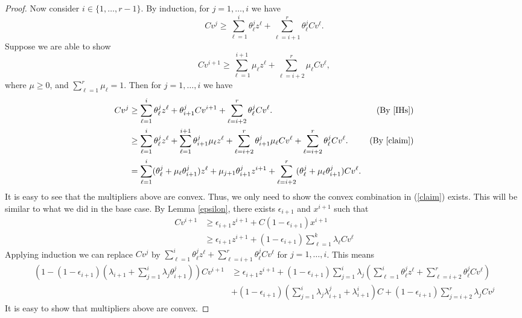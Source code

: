 \begin{proof}
	Now consider $i\in \{1,\ldots,r-1\}$. By induction, for $j=1,\ldots,i$ we have
	\begin{equation}\label{IHs}
	Cv^j \geq  \sum_{\ell=1}^{i} \theta^{j}_\ell z^\ell + \sum_{\ell=i+1}^{r}\theta^{j}_{\ell}Cv^\ell.
	\end{equation}
	Suppose we are able to show 
	 \begin{equation}\label{claim} 
	 Cv^{i+1} \geq \sum_{\ell=1}^{i+1} \mu_\ell z^\ell + \sum_{\ell=i+2}^{r}\mu_{\ell}Cv^\ell,\end{equation} 
	where $\mu\geq 0$, and $\sum_{\ell=1}^{r}\mu_{\ell}=1$. Then for $j=1,\ldots,i$ we have
	\begin{align*}
	Cv^j& \geq \sum_{\ell=1}^{i} \theta^{j}_\ell z^\ell +\theta^{j}_{i+1}Cv^{i+1}+  \sum_{\ell=i+2}^{r}\theta^{j}_{\ell}Cv^\ell.& (\mbox{By } \ref{IHs})\\
		& \geq \sum_{\ell=1}^{i} \theta^{j}_\ell z^\ell +\sum_{\ell=1}^{i+1}\theta^{j}_{i+1}\mu_\ell z^\ell+ \sum_{\ell=i+2}^{r}\theta^j_{i+1}\mu_{\ell}Cv^\ell +   \sum_{\ell=i+2}^{r}\theta^{j}_{\ell}Cv^\ell.& (\mbox{By } \ref{claim})\\
		&= \sum_{\ell=1}^{i} (\theta^j_\ell+\mu_{\ell}\theta^j_{i+1}) z^\ell + \mu_{j+1}\theta^j_{i+1}z^{i+1} + \sum_{\ell=i+2}^{r} (\theta^j_\ell+\mu_\ell\theta^j_{i+1})Cv^\ell.&
 			\end{align*} 
		It is easy to see that the multipliers above are convex. Thus, we only need to show the convex combination in (\ref{claim}) exists. This will be similar to what we did in the base case. By Lemma \ref{epsilon}, there exists $\epsilon_{i+1}$ and $x^{i+1}$ such that
		\begin{align*}
		Cv^{i+1}&\geq \epsilon_{i+1}z^{i+1}+ C(1-\epsilon_{i+1})x^{i+1}\\
		&\geq \epsilon_{i+1}z^{i+1}+ (1-\epsilon_{i+1})\sum_{\ell=1}^{k}\lambda_{\ell}Cv^\ell
			\end{align*}
			Applying induction we can replace $Cv^j$ by $ \sum_{\ell=1}^{i} \theta^{j}_\ell z^\ell + \sum_{\ell=i+1}^{r}\theta^{j}_{\ell}Cv^\ell$ for $j=1,\ldots,i$. 
			This means
			\begin{align*}
			(1-(1-\epsilon_{i+1})(\lambda_{i+1}+\sum_{j=1}^{i}\lambda_j\theta^j_{i+1}))Cv^{i+1}&\geq \epsilon_{i+1}z^{i+1}+(1-\epsilon_{i+1})\sum_{j=1}^{i}\lambda_j (\sum_{\ell=1}^{i}\theta^j_\ell z^\ell+ \sum_{\ell=i+2}^{r}\theta^j_\ell Cv^\ell)\\
			&+(1-\epsilon_{i+1})(\sum_{j=1}^{i}\lambda_j \lambda^j_{i+1}+\lambda^i_{i+1})C+ (1-\epsilon_{i+1})\sum_{j=i+2}^{r}\lambda_jCv^{j} 
			\end{align*}
			It is easy to show that  multipliers above are convex.
\end{proof}

